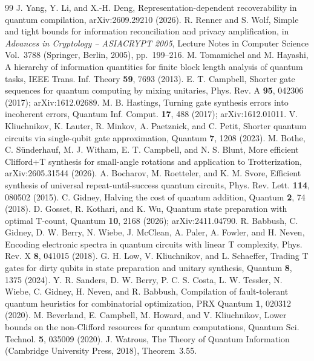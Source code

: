 \documentclass[aps,prx,twocolumn,superscriptaddress,nofootinbib,longbibliography]{revtex4-2}
\theoremstyle{plain}
\theoremstyle{definition}
\theoremstyle{remark}
\begin{document}
\begin{thebibliography}{99}
 J. Yang, Y. Li, and X.-H. Deng, Representation-dependent recoverability in quantum compilation, arXiv:2609.29210 (2026).
 R. Renner and S. Wolf, Simple and tight bounds for information reconciliation and privacy amplification, in \emph{Advances in Cryptology -- ASIACRYPT 2005}, Lecture Notes in Computer Science Vol.~3788 (Springer, Berlin, 2005), pp.~199--216.
 M. Tomamichel and M. Hayashi, A hierarchy of information quantities for finite block length analysis of quantum tasks, IEEE Trans. Inf. Theory \textbf{59}, 7693 (2013).
 E. T. Campbell, Shorter gate sequences for quantum computing by mixing unitaries, Phys. Rev. A \textbf{95}, 042306 (2017); arXiv:1612.02689.
 M. B. Hastings, Turning gate synthesis errors into incoherent errors, Quantum Inf. Comput. \textbf{17}, 488 (2017); arXiv:1612.01011.
 V. Kliuchnikov, K. Lauter, R. Minkov, A. Paetznick, and C. Petit, Shorter quantum circuits via single-qubit gate approximation, Quantum \textbf{7}, 1208 (2023).
 M. Bothe, C. S\"underhauf, M. J. Witham, E. T. Campbell, and N. S. Blunt, More efficient Clifford+T synthesis for small-angle rotations and application to Trotterization, arXiv:2605.31544 (2026).
 A. Bocharov, M. Roetteler, and K. M. Svore, Efficient synthesis of universal repeat-until-success quantum circuits, Phys. Rev. Lett. \textbf{114}, 080502 (2015).
 C. Gidney, Halving the cost of quantum addition, Quantum \textbf{2}, 74 (2018).
 D. Gosset, R. Kothari, and K. Wu, Quantum state preparation with optimal T-count, Quantum \textbf{10}, 2168 (2026); arXiv:2411.04790.
 R. Babbush, C. Gidney, D. W. Berry, N. Wiebe, J. McClean, A. Paler, A. Fowler, and H. Neven, Encoding electronic spectra in quantum circuits with linear T complexity, Phys. Rev. X \textbf{8}, 041015 (2018).
 G. H. Low, V. Kliuchnikov, and L. Schaeffer, Trading T gates for dirty qubits in state preparation and unitary synthesis, Quantum \textbf{8}, 1375 (2024).
 Y. R. Sanders, D. W. Berry, P. C. S. Costa, L. W. Tessler, N. Wiebe, C. Gidney, H. Neven, and R. Babbush, Compilation of fault-tolerant quantum heuristics for combinatorial optimization, PRX Quantum \textbf{1}, 020312 (2020).
 M. Beverland, E. Campbell, M. Howard, and V. Kliuchnikov, Lower bounds on the non-Clifford resources for quantum computations, Quantum Sci. Technol. \textbf{5}, 035009 (2020).
 J. Watrous, The Theory of Quantum Information (Cambridge University Press, 2018), Theorem~3.55.
\end{thebibliography}
\end{document}
